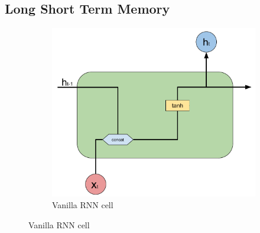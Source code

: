 

\subsection{Long Short Term Memory}
\label{sec:lstm}

\begin{figure}[]
    \centering
    \begin{subfigure}[t]{0.5\textwidth}
        \centering
        \includegraphics[width=\textwidth]{images/RNN_cell_simple.pdf}
        \caption{Vanilla RNN cell}
        \label{subfig:rnn_cell}


\end{subfigure}
\end{figure}
